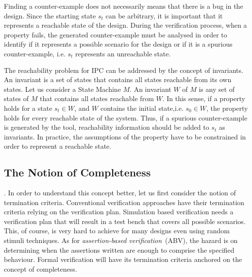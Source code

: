 Finding a counter-example does not necessarily means that there is a bug in the design. Since the starting state $s_t$ can be arbitrary, it is important that it represents a reachable state of the design. During the verification process, when a property fails, the generated counter-example must be analysed in order to identify if it represents a possible scenario for the design or if it is a spurious counter-example, i.e. $s_t$ represents an unreachable state.

The reachability problem for IPC can be addressed by the concept of invariants. An invariant is a set of states that contains all states reachable from its own states. Let us consider a State Machine $M$. An invariant $W$ of $M$ is any set of states of $M$ that contains all states reachable from $W$. In this sense, if a property holds for a state $s_t \in W$, and $W$  contains the initial state,i.e. $s_0 \in W$, the property holds for every reachable state of the system. Thus, if a spurious counter-example is generated by the tool, reachability information should be added to $s_t$ as invariants. In practice, the assumptions of the property have to be constrained in order to represent a reachable state. 

\subsection{The Notion of Completeness}
\label{subsection:notion-completeness}


 . In order to understand this concept better, let us first consider the notion of termination criteria. Conventional verification approaches have their termination criteria relying on the verification plan. Simulation based verification needs a verification plan that will result in a test bench that covers all possible scenarios. This, of course, is very hard to achieve for many designs even using random stimuli techniques. As for \textit{assertion-based verification}~(ABV), the hazard is on determining when the assertions written are enough to comprise the specified behaviour. Formal verification will have its termination criteria anchored on the concept of completeness.

